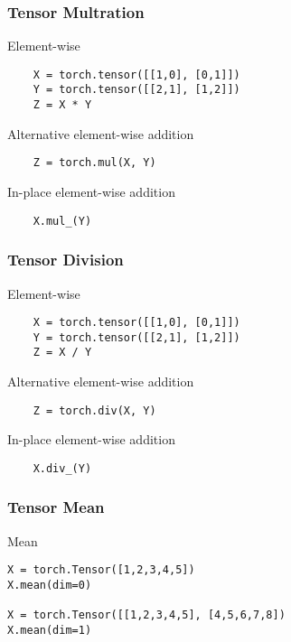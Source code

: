 \documentclass[14 pt]{beamer}
\begin{document}
\begin{frame}[fragile]
  \frametitle{Tensor Multration}
  \begin{block}{Element-wise}
\begin{verbatim}
    X = torch.tensor([[1,0], [0,1]]) 
    Y = torch.tensor([[2,1], [1,2]]) 
    Z = X * Y 
\end{verbatim}
  \end{block}
  \begin{block}{Alternative element-wise addition}
\begin{verbatim}
    Z = torch.mul(X, Y)
\end{verbatim}
  \end{block}
  \begin{block}{In-place element-wise addition}
\begin{verbatim}
    X.mul_(Y) 
\end{verbatim}
  \end{block}
\end{frame}

\begin{frame}[fragile]
  \frametitle{Tensor Division}
  \begin{block}{Element-wise}
\begin{verbatim}
    X = torch.tensor([[1,0], [0,1]]) 
    Y = torch.tensor([[2,1], [1,2]]) 
    Z = X / Y 
\end{verbatim}
  \end{block}
  \begin{block}{Alternative element-wise addition}
\begin{verbatim}
    Z = torch.div(X, Y)
\end{verbatim}
  \end{block}
  \begin{block}{In-place element-wise addition}
\begin{verbatim}
    X.div_(Y) 
\end{verbatim}
  \end{block}
\end{frame}


\begin{frame}[fragile]
  \frametitle{Tensor Mean}
  \begin{block}{Mean}
\begin{verbatim}
X = torch.Tensor([1,2,3,4,5])
X.mean(dim=0)

X = torch.Tensor([[1,2,3,4,5], [4,5,6,7,8])
X.mean(dim=1)
\end{verbatim}
  \end{block}
\end{frame}
\end{document}
